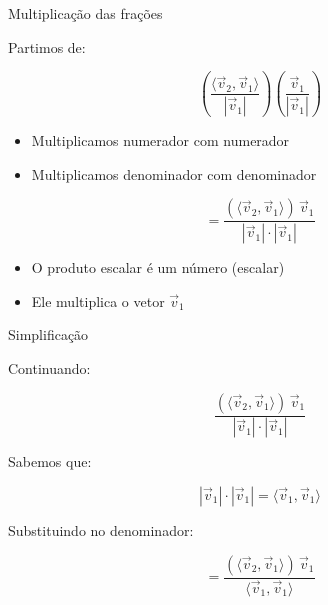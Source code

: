 \documentclass{beamer}
\begin{document}
\begin{frame}{Multiplicação das frações}


\vspace{0.5cm}

Partimos de:

\[
\left(\frac{\langle \vec{v}_2 , \vec{v}_1 \rangle}{|\vec{v}_1|}\right)
\left(\frac{\vec{v}_1}{|\vec{v}_1|}\right)
\]

\vspace{0.5cm}

\begin{itemize}
    \item Multiplicamos numerador com numerador
    \item Multiplicamos denominador com denominador
\end{itemize}

\vspace{0.5cm}

\[
=
\frac{(\langle \vec{v}_2 , \vec{v}_1 \rangle)\,\vec{v}_1}{|\vec{v}_1|\cdot|\vec{v}_1|}
\]

\vspace{0.5cm}

\begin{itemize}
    \item O produto escalar é um número (escalar)
    \item Ele multiplica o vetor $\vec{v}_1$
\end{itemize}

\end{frame}
\begin{frame}{Simplificação}


\vspace{0.5cm}

Continuando:

\[
\frac{(\langle \vec{v}_2 , \vec{v}_1 \rangle)\,\vec{v}_1}{|\vec{v}_1|\cdot|\vec{v}_1|}
\]

\vspace{0.5cm}


Sabemos que:


\vspace{0.3cm}

\[
|\vec{v}_1|\cdot|\vec{v}_1| = \langle \vec{v}_1 , \vec{v}_1 \rangle
\]


\vspace{0.5cm}

Substituindo no denominador:

\[
=
\frac{(\langle \vec{v}_2 , \vec{v}_1 \rangle)\,\vec{v}_1}{\langle \vec{v}_1 , \vec{v}_1 \rangle}
\]

\end{frame}
\end{document}
